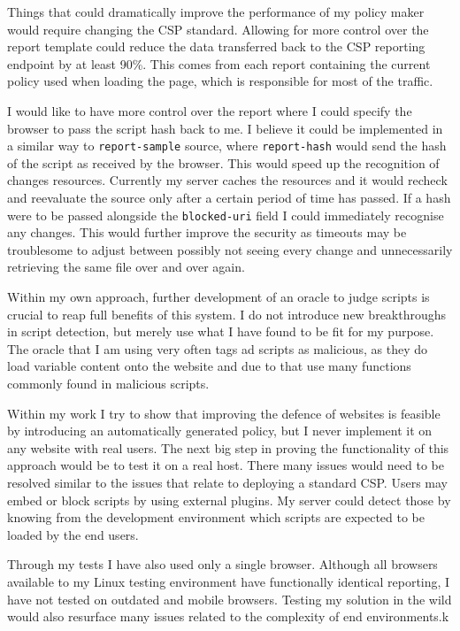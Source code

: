 Things that could dramatically improve the performance of my policy maker would require changing the CSP standard.
Allowing for more control over the report template could reduce the data transferred back to the CSP reporting endpoint by at least 90\%.
This comes from each report containing the current policy used when loading the page, which is responsible for most of the traffic.

I would like to have more control over the report where I could specify the browser to pass the script hash back to me.
I believe it could be implemented in a similar way to \texttt{report-sample} source, where \texttt{report-hash} would send the hash of the script as received by the browser.
This would speed up the recognition of changes resources. 
Currently my server caches the resources and it would recheck and reevaluate the source only after a certain period of time has passed.
If a hash were to be passed alongside the \texttt{blocked-uri} field I could immediately recognise any changes.
This would further improve the security as timeouts may be troublesome to adjust between possibly not seeing every change and unnecessarily retrieving the same file over and over again.

Within my own approach, further development of an oracle to judge scripts is crucial to reap full benefits of this system.
I do not introduce new breakthroughs in script detection, but merely use what I have found to be fit for my purpose.
The oracle that I am using very often tags ad scripts as malicious, as they do load variable content onto the website and due to that use many functions commonly found in malicious scripts.

Within my work I try to show that improving the defence of websites is feasible by introducing an automatically generated policy, but I never implement it on any website with real users.
The next big step in proving the functionality of this approach would be to test it on a real host.
There many issues would need to be resolved similar to the issues that relate to deploying a standard CSP.
Users may embed or block scripts by using external plugins. 
My server could detect those by knowing from the development environment which scripts are expected to be loaded by the end users. 

Through my tests I have also used only a single browser.
Although all browsers available to my Linux testing environment have functionally identical reporting, I have not tested on outdated and mobile browsers.
Testing my solution in the wild would also resurface many issues related to the complexity of end environments.k

